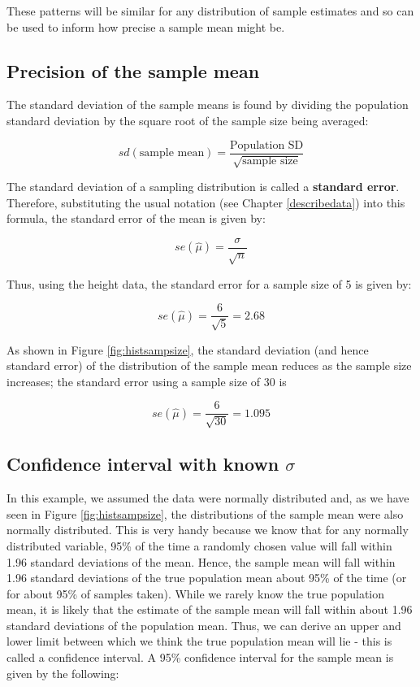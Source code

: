 \documentclass[
  oneside]{krantz}
\begin{document}
These patterns will be similar for any distribution of sample estimates and so can be used to inform how precise a sample mean might be.

\hypertarget{precision-of-the-sample-mean}{%
\subsection{Precision of the sample mean}\label{precision-of-the-sample-mean}}

The standard deviation of the sample means is found by dividing the population standard deviation by the square root of the sample size being averaged:

\[sd(\textrm{sample mean}) = \frac{\textrm{Population SD}}{\sqrt{\textrm{sample size}}}\]

The standard deviation of a sampling distribution is called a \textbf{standard error}. Therefore, substituting the usual notation (see Chapter \ref{describedata}) into this formula, the standard error of the mean is given by:

\[se(\hat \mu) = \frac{\sigma}{\sqrt{n}}\]

Thus, using the height data, the standard error for a sample size of 5 is given by:

\[se(\hat \mu) = \frac{6}{\sqrt{5}} = 2.68\]

As shown in Figure \ref{fig:histsampsize}, the standard deviation (and hence standard error) of the distribution of the sample mean reduces as the sample size increases; the standard error using a sample size of 30 is

\[se(\hat \mu) = \frac{6}{\sqrt{30}} = 1.095\]

\hypertarget{confidence-interval-with-known-sigma}{%
\subsection{\texorpdfstring{Confidence interval with known \(\sigma\)}{Confidence interval with known \textbackslash sigma}}\label{confidence-interval-with-known-sigma}}

In this example, we assumed the data were normally distributed and, as we have seen in Figure \ref{fig:histsampsize}, the distributions of the sample mean were also normally distributed. This is very handy because we know that for any normally distributed variable, 95\% of the time a randomly chosen value will fall within 1.96 standard deviations of the mean. Hence, the sample mean will fall within 1.96 standard deviations of the true population mean about 95\% of the time (or for about 95\% of samples taken). While we rarely know the true population mean, it is likely that the estimate of the sample mean will fall within about 1.96 standard deviations of the population mean. Thus, we can derive an upper and lower limit between which we think the true population mean will lie - this is called a confidence interval. A 95\% confidence interval for the sample mean is given by the following:
\end{document}
